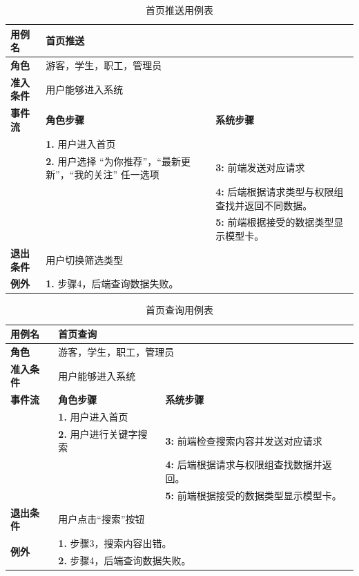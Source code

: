 \begin{table}[H]
  \centering
  \renewcommand\arraystretch{1.1}
  \small
  \caption{首页推送用例表}
  \setlength{\tabcolsep}{4mm}
  \begin{tabular}{|p{2cm}|p{5.75cm}|p{5.75cm}|}
    \hline \textbf{用例名} & \multicolumn{2}{l|}{首页推送} \\
    \hline \textbf{角色} & \multicolumn{2}{l|}{游客，学生，职工，管理员} \\
    \hline \textbf{准入条件} & \multicolumn{2}{l|}{用户能够进入系统} \\
    \hline \textbf{事件流} & \textbf{角色步骤} & \textbf{系统步骤} \\
    \hline \multirow{3}{*}{~} & \textbf{1.} 用户进入首页  &    \\
    \cline{2-3} & \textbf{2.} 用户选择 ``为你推荐''，``最新更新''，``我的关注'' 任一选项 & \textbf{3:} 前端发送对应请求 \\
    \cline{2-3} &  & \textbf{4:} 后端根据请求类型与权限组查找并返回不同数据。 \\
    \cline{2-3} &  & \textbf{5:} 前端根据接受的数据类型显示模型卡。 \\
    \hline \textbf{退出条件}  & \multicolumn{2}{l|}{用户切换筛选类型} \\
    \hline \multirow{1}{*}{\textbf{例外}} & \multicolumn{2}{l|}{\textbf{1.} 步骤4，后端查询数据失败。} \\
    \hline
  \end{tabular}
\end{table}

\begin{table}[H]
  \centering
  \renewcommand\arraystretch{1.1}
  \small
  \caption{首页查询用例表}
  \setlength{\tabcolsep}{4mm}
  \begin{tabular}{|p{2cm}|p{5.75cm}|p{5.75cm}|}
    \hline \textbf{用例名} & \multicolumn{2}{l|}{首页查询} \\
    \hline \textbf{角色} & \multicolumn{2}{l|}{游客，学生，职工，管理员} \\
    \hline \textbf{准入条件} & \multicolumn{2}{l|}{用户能够进入系统} \\
    \hline \textbf{事件流} & \textbf{角色步骤} & \textbf{系统步骤} \\
    \hline \multirow{3}{*}{~} & \textbf{1.} 用户进入首页  &    \\
    \cline{2-3} & \textbf{2.} 用户进行关键字搜索 & \textbf{3:} 前端检查搜索内容并发送对应请求 \\
    \cline{2-3} &  & \textbf{4:} 后端根据请求与权限组查找数据并返回。 \\
    \cline{2-3} &  & \textbf{5:} 前端根据接受的数据类型显示模型卡。 \\
    \hline \textbf{退出条件}  & \multicolumn{2}{l|}{用户点击``搜索''按钮} \\
    \hline \multirow{2}{*}{\textbf{例外}} & \multicolumn{2}{l|}{\textbf{1.} 步骤3，搜索内容出错。} \\
     & \multicolumn{2}{l|}{\textbf{2.} 步骤4，后端查询数据失败。} \\
    \hline
  \end{tabular}
\end{table}

